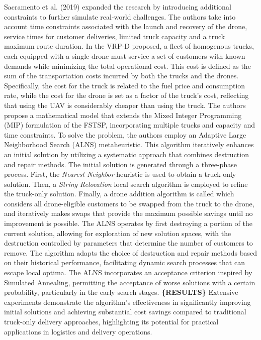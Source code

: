 \documentclass{article}
\begin{document}
	Sacramento et al. (2019) \cite{Sacramento2019} expanded the research by introducing additional constraints to further simulate real-world challenges. The authors take into account time constraints associated with the launch and recovery of the drone, service times for customer deliveries, limited truck capacity and a truck maximum route duration. In the VRP-D proposed, a fleet of homogenous trucks, each equipped with a single drone must service a set of customers with known demands while minimizing the total operational cost. This cost is defined as the sum of the transportation costs incurred by both the trucks and the drones. Specifically, the cost for the truck is related to the fuel price and consumption rate, while the cost for the drone is set as a factor of the truck's cost, reflecting that using the UAV is considerably cheaper than using the truck. The authors propose a mathematical model that extends the Mixed Integer Programming (MIP) formulation of the FSTSP, incorporating multiple trucks and capacity and time constraints. To solve the problem, the authors employ an Adaptive Large Neighborhood Search (ALNS) metaheuristic. This algorithm iteratively enhances an initial solution by utilizing a systematic approach that combines destruction and repair methods. The initial solution is generated through a three-phase process. First, the \textit{Nearest Neighbor} heuristic is used to obtain a truck-only solution. Then, a \textit{String Relocation} local search algorithm is employed to refine the truck-only solution. Finally, a drone addition algorithm is called which considers all drone-eligible customers to be swapped from the truck to the drone, and iteratively makes swaps that provide the maximum possible savings until no improvement is possible. The ALNS operates by first destroying a portion of the current solution, allowing for exploration of new solution spaces, with the destruction controlled by parameters that determine the number of customers to remove. The algorithm adapts the choice of destruction and repair methods based on their historical performance, facilitating dynamic search processes that can escape local optima. The ALNS incorporates an acceptance criterion inspired by Simulated Annealing, permitting the acceptance of worse solutions with a certain probability, particularly in the early search stages. \textbf{\{RESULTS\}} Extensive experiments demonstrate the algorithm's effectiveness in significantly improving initial solutions and achieving substantial cost savings compared to traditional truck-only delivery approaches, highlighting its potential for practical applications in logistics and delivery operations.
\end{document}
